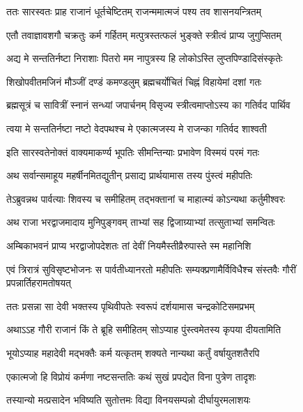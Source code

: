 \twolineshloka
{ततः सारस्वतः प्राह राजानं धूर्तचेष्टितम्}
{राजन्ममात्मजं पश्य तव शासनयन्त्रितम्} %

\twolineshloka
{एतौ तवाज्ञावशगौ चक्रतुः कर्म गर्हितम्}
{मत्पुत्रस्तत्फलं भुङ्क्ते स्त्रीत्वं प्राप्य जुगुप्सितम्} %

\twolineshloka
{अद्य मे सन्ततिर्नष्टा निराशाः पितरो मम}
{नापुत्रस्य हि लोकोऽस्ति लुप्तपिण्डादिसंस्कृतेः} %

\twolineshloka
{शिखोपवीतमजिनं मौञ्जीं दण्डं कमण्डलुम्}
{ब्रह्मचर्योचितं चिह्नं विहायेमां दशां गतः} %

\twolineshloka
{ब्रह्मसूत्रं च सावित्रीं स्नानं सन्ध्यां जपार्चनम्}
{विसृज्य स्त्रीत्वमाप्तोऽस्य का गतिर्वद पार्थिव} %

\twolineshloka
{त्वया मे सन्ततिर्नष्टा नष्टो वेदपथश्च मे}
{एकात्मजस्य मे राजन्का गतिर्वद शाश्वती} %

\twolineshloka
{इति सारस्वतेनोक्तं वाक्यमाकर्ण्य भूपतिः}
{सीमन्तिन्याः प्रभावेण विस्मयं परमं गतः} %

\twolineshloka
{अथ सर्वान्समाहूय महर्षीनमितद्युतीन्}
{प्रसाद्य प्रार्थयामास तस्य पुंस्त्वं महीपतिः} %

\twolineshloka
{तेऽब्रुवन्नथ पार्वत्याः शिवस्य च समीहितम्}
{तद्भक्तानां च माहात्म्यं कोऽन्यथा कर्तुमीश्वरः} %

\twolineshloka
{अथ राजा भरद्वाजमादाय मुनिपुङ्गवम्}
{ताभ्यां सह द्विजाग्र्याभ्यां तत्सुताभ्यां समन्वितः} %

\twolineshloka
{अम्बिकाभवनं प्राप्य भरद्वाजोपदेशतः}
{तां देवीं नियमैस्तीव्रैरुपास्ते स्म महानिशि} %

\fourlineindentedshloka
{एवं त्रिरात्रं सुविसृष्टभोजनः}
{स पार्वतीध्यानरतो महीपतिः}
{सम्यक्प्रणामैर्विविधैश्च संस्तवैः}
{गौरीं प्रपन्नार्तिहरामतोषयत्} %

\twolineshloka
{ततः प्रसन्ना सा देवी भक्तस्य पृथिवीपतेः}
{स्वरूपं दर्शयामास चन्द्रकोटिसमप्रभम्} %

\twolineshloka
{अथाऽऽह गौरी राजानं किं ते ब्रूहि समीहितम्}
{सोऽप्याह पुंस्त्वमेतस्य कृपया दीयतामिति} %

\twolineshloka
{भूयोऽप्याह महादेवी मद्भक्तैः कर्म यत्कृतम्}
{शक्यते नान्यथा कर्तुं वर्षायुतशतैरपि} %

\twolineshloka
{एकात्मजो हि विप्रोयं कर्मणा नष्टसन्ततिः}
{कथं सुखं प्रपद्येत विना पुत्रेण तादृशः} %

\twolineshloka
{तस्यान्यो मत्प्रसादेन भविष्यति सुतोत्तमः}
{विद्या विनयसम्पन्नो दीर्घायुरमलाशयः} %

